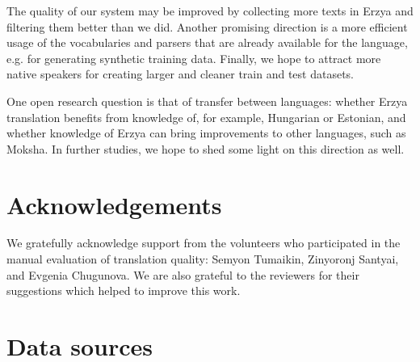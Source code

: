 \documentclass[11pt]{article}
\begin{document}
The quality of our system may be improved by collecting more texts in Erzya and filtering them better than we did. Another promising direction is a more efficient usage of the vocabularies and parsers that are already available for the language, e.g. for generating synthetic training data. Finally, we hope to attract more native speakers for creating larger and cleaner train and test datasets.

One open research question is that of transfer between languages: whether Erzya translation benefits from knowledge of, for example, Hungarian or Estonian, and whether knowledge of Erzya can bring improvements to other languages, such as Moksha. In further studies, we hope to shed some light on this direction as well.

\section{Acknowledgements}
We gratefully acknowledge support from the volunteers who participated in the manual evaluation of translation quality: Semyon Tumaikin, Zinyoronj Santyai, and Evgenia Chugunova. We are also grateful to the reviewers for their suggestions which helped to improve this work.






\appendix
\onecolumn

\section{Data sources}
\label{app:sources}
\end{document}
